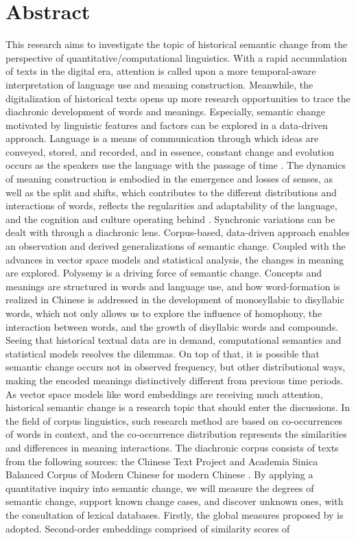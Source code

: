 

\chapter*{Abstract}
This research aims to investigate the topic of historical semantic change from the perspective of quantitative/computational linguistics. With a rapid accumulation of texts in the digital era, attention is called upon a more temporal-aware interpretation of language use and meaning construction. Meanwhile, the digitalization of historical texts opens up more research opportunities to trace the diachronic development of words and meanings. Especially, semantic change motivated by linguistic features and factors can be explored in a data-driven approach. Language is a means of communication through which ideas are conveyed, stored, and recorded, and in essence, constant change and evolution occurs as the speakers use the language with the passage of time \parencite[61]{blank1999new}. The dynamics of meaning construction is embodied in the emergence and losses of senses, as well as the split and shifts, which contributes to the different distributions and interactions of words, reflects the regularities and adaptability of the language, and the cognition and culture operating behind \parencite[63]{blank1999new}. Synchronic variations can be dealt with through a diachronic lens. Corpus-based, data-driven approach enables an observation and derived generalizations of semantic change. Coupled with the advances in vector space models and statistical analysis, the changes in meaning are explored. Polysemy is a driving force of semantic change. Concepts and meanings are structured in words and language use, and how word-formation is realized in Chinese is addressed in the development of monosyllabic to disyllabic words, which not only allows us to explore the influence of homophony, the interaction between words, and the growth of disyllabic words and compounds. Seeing that historical textual data are in demand, computational semantics and statistical models resolves the dilemmas. On top of that, it is possible that semantic change occurs not in observed frequency, but other distributional ways, making the encoded meanings distinctively different from previous time periods. As vector space models like word embeddings are receiving much attention, historical semantic change is a research topic that should enter the discussions. In the field of corpus linguistics, such research method are based on co-occurrences of words in context, and the co-occurrence distribution represents the similarities and differences in meaning interactions. The diachronic corpus consists of texts from the following sources: the Chinese Text Project \parencite{sturgeon2019ctext} and Academia Sinica Balanced Corpus of Modern Chinese for modern Chinese \parencite{chen1996sinica}. By applying a quantitative inquiry into semantic change, we will measure the degrees of semantic change, support known change cases, and discover unknown ones, with the consultation of lexical databases. Firstly, the global measures proposed by \textcite{hamilton2016cultural} is adopted. Second-order embeddings comprised of similarity scores of 